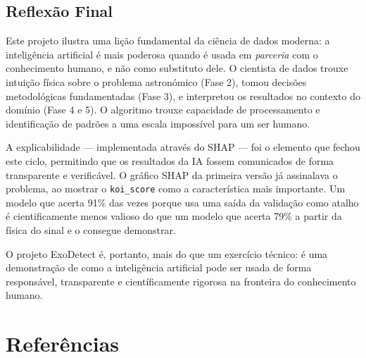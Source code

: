 \documentclass[12pt, a4paper]{report}
\begin{document}
\section{Reflexão Final}

Este projeto ilustra uma lição fundamental da ciência de dados moderna: a inteligência artificial é mais poderosa quando é usada em \textit{parceria} com o conhecimento humano, e não como substituto dele. O cientista de dados trouxe intuição física sobre o problema astronómico (Fase 2), tomou decisões metodológicas fundamentadas (Fase 3), e interpretou os resultados no contexto do domínio (Fase 4 e 5). O algoritmo trouxe capacidade de processamento e identificação de padrões a uma escala impossível para um ser humano.

A explicabilidade — implementada através do SHAP — foi o elemento que fechou este ciclo, permitindo que os resultados da IA fossem comunicados de forma transparente e verificável. O gráfico SHAP da primeira versão já assinalava o problema, ao mostrar o \texttt{koi\_score} como a característica mais importante. Um modelo que acerta 91\% das vezes porque usa uma saída da validação como atalho é cientificamente menos valioso do que um modelo que acerta 79\% a partir da física do sinal e o consegue demonstrar.

O projeto ExoDetect é, portanto, mais do que um exercício técnico: é uma demonstração de como a inteligência artificial pode ser usada de forma responsável, transparente e científicamente rigorosa na fronteira do conhecimento humano.

\chapter*{Referências}
\end{document}
